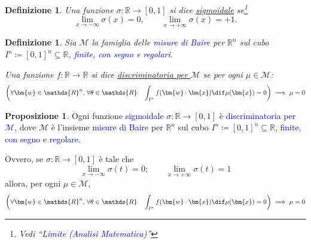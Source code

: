 \documentclass[10pt]{book}
\newcommand{\1}{\mathds{1}}
\newcommand{\R}{\mathds{R}}
\theoremstyle{definition}%
\newtheorem{prop}[thm]{Proposizione}
\theoremstyle{plain}
\newtheorem{definizione}[thm]{Definizione}
\theoremstyle{remark}
\renewcommand{\href}[2]{\textcolor{blue}{#2}}
\begin{document}
\begin{definizione}
Una funzione \(\sigma:\R\to [0,1]\) si dice \uline{sigmoidale} se\footnote{Vedi ``\href{../../../../../org/roam/20250625110412-limite_analisi_matematica.org}{Limite (Analisi Matematica)}''}
\begin{equation*}
\lim_{x\to-\infty} \sigma(x) = 0,\qquad \lim_{x\to +\infty} \sigma(x)= +1.
\end{equation*}
\end{definizione}
\begin{definizione}
Sia \(\mathcal{M}\) la famiglia delle \href{../../../../../org/roam/20250625104200-misura_di_baire.org}{misure di Baire} per \(\R^{n}\) sul cubo \(I^{n} \coloneqq [0,1]^{n} \subseteq \R\), \href{../../../../../org/roam/20250625110016-misura_finita.org}{finite}, \href{../../../../../org/roam/20250625110024-misura_con_segno.org}{con segno} e \href{../../../../../org/roam/20250625110032-misura_regolare.org}{regolari}.

Una funzione \(f: \R\to \R\) si dice \uline{discriminatoria per \(\mathcal{M}\)} se per ogni \(\mu \in \mathcal{M}\):
\begin{equation*}
\left(\forall \bm{w} \in \R^{n},\, \forall \theta \in \R\quad \int_{I^{n}} f(\bm{w}\cdot\bm{x}) \dif \mu(\bm{x}) = 0\right)\implies \mu=0
\end{equation*}
\end{definizione}
\begin{prop}
Ogni funzione \href{../../../../../org/roam/20250625110110-funzione_sigmoidale.org}{sigmoidale} \(\sigma:\R\to [0,1]\) è \href{../../../../../org/roam/20250625105528-funzione_discriminatoria_per_una_misura_di_baire_sul_cubo_unitario.org}{discriminatoria per \(\mathcal{M}\)}, dove \(\mathcal{M}\) è l'insieme \href{../../../../../org/roam/20250625104200-misura_di_baire.org}{misure di Baire} per \(\R^{n}\) sul cubo \(I^{n} \coloneqq [0,1]^{n} \subseteq \R\), \href{../../../../../org/roam/20250625110016-misura_finita.org}{finite}, \href{../../../../../org/roam/20250625110024-misura_con_segno.org}{con segno} e \href{../../../../../org/roam/20250625110032-misura_regolare.org}{regolare}.

Ovvero, se \(\sigma:\R\to [0,1]\) è tale che
\begin{equation*}
\lim_{x\to-\infty}\sigma(t) =0;\qquad \lim_{x\to+\infty}\sigma(t)=1
\end{equation*}
allora, per ogni \(\mu \in \mathcal{M}\),
\begin{equation*}
\left(\forall \bm{w} \in \R^{n},\, \forall \theta \in \R\quad \int_{I^{n}} f(\bm{w}\cdot\bm{x}) \dif \mu(\bm{x}) = 0\right)\implies \mu=0
\end{equation*}
\end{prop}
\end{document}
